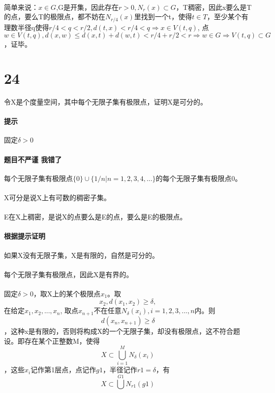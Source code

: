 \paragraph{} 简单来说：$ x \in G$,G是开集，因此存在$r>0, N_r(x) \subset G$，T稠密，因此x要么是T的点，要么T的极限点，都不妨在$N_{r/4}(x)$里找到一个t，使得$t \in T$，至少某个有理数半径q使得$ r/4 < q < r/2, d(t,x) < r/4 < q \Rightarrow x \in V(t, q)$, 点$w \in V(t,q) , d(x, w) \le d(x, t) + d(w, t) < r/4 + r/2 < r \Rightarrow w \in G \Rightarrow V(t,q) \subset G$，证毕。
\section*{24} 令X是个度量空间，其中每个无限子集有极限点，证明X是可分的。
\paragraph{提示} 固定$\delta > 0$
\paragraph{题目不严谨 我错了} 每个无限子集有极限点$\{0\} \cup \{1/n | n=1,2,3,4,...\}$的每个无限子集有极限点0。
\paragraph{} X可分是说X上有可数的稠密子集。
\paragraph{} E在X上稠密，是说X的点要么是E的点，要么是E的极限点。
\paragraph{根据提示证明} 如果X没有无限子集，X是有限的，自然是可分的。
\paragraph{} 每个无限子集有极限点，因此X是有界的。
\paragraph{} 固定$\delta > 0$，取X上的某个极限点$x_1$。取$$x_2, d(x_1,x_2) \ge \delta ,$$在给定$x_1, x_2, ..., x_n$, 取点$x_{n+1}$不在任意$N_{\delta}(x_i) , i = 1, 2, 3, ..., n$内。则$$d(x_{n}, x_{n+1}) \ge \delta$$，这种x是有限的，否则将构成X的一个无限子集，却没有极限点，这不符合题设。即存在某个正整数M，使得$$ X \subset \bigcup_{i=1}^{M}N_{\delta}(x_i) $$，这些$x_i$记作第1层点，点记作$g1$，半径记作$r1=\delta$，有$$ X \subset \bigcup^{G1}N_{r1}(g1) $$
